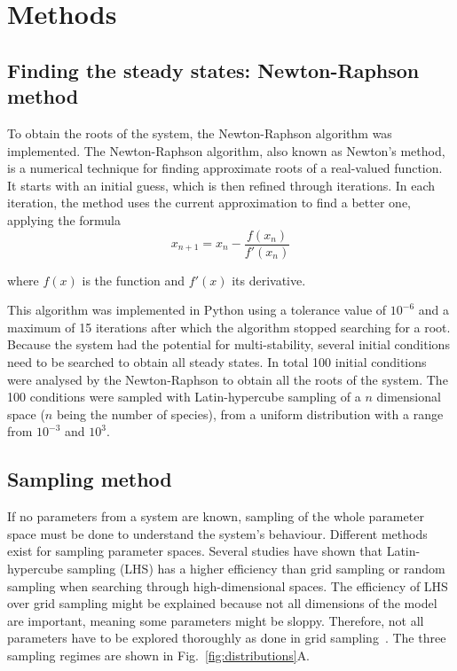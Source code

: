 \chapter{Methods}
\section{Finding the steady states: Newton-Raphson method}\label{newton_raphson}

To obtain the roots of the system, the Newton-Raphson algorithm was implemented.
The Newton-Raphson algorithm, also known as Newton's method, is a numerical technique for finding approximate roots of a real-valued function. It starts with an initial guess, which is then refined through iterations. In each iteration, the method uses the current approximation to find a better one, applying the formula
\begin{equation}
x_{n+1} = x_{n} - \frac{f(x_{n})}{f'(x_{n})}
\end{equation}

where $f(x)$ is the function and $f'(x)$ its derivative.

This algorithm was implemented in Python using a tolerance value of $10^{-6}$ and a maximum of 15 iterations after which the algorithm stopped searching for a root.
Because the system had the potential for multi-stability, several initial conditions need to be searched to obtain all steady states.
In total 100 initial conditions were analysed by the Newton-Raphson to obtain all the roots of the system.
The 100 conditions were sampled with Latin-hypercube sampling of a $n$ dimensional space ($n$ being the number of species), from a uniform distribution with a range from $10^{-3}$ and $10^3$.
\section{Sampling method}\label{sampling method}
If no parameters from a system are known, sampling of the whole parameter space must be done to understand the system's behaviour.
Different methods exist for sampling parameter spaces.
Several studies have shown that Latin-hypercube sampling (LHS) has a higher efficiency than grid sampling or random sampling when searching through high-dimensional spaces.
The efficiency of LHS over grid sampling might be explained because not all dimensions of the model are important, meaning some parameters might be sloppy.
Therefore, not all parameters have to be explored thoroughly as done in grid sampling~\parencite{Iman2014, Bergstra2012}.
The three sampling regimes are shown in Fig.~\ref{fig:distributions}A.

